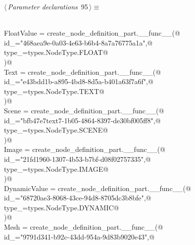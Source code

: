 \documentclass[
    a4paper,      %
    10pt,         %
    openright,    %
    notitlepage,  %
    parskip=half, %
]{scrreprt}       %
\theoremstyle{definition}                    %
\begin{document}
\begin{flushleft} \small
\begin{minipage}{\linewidth}\label{scrap152}\raggedright\small
{} $\langle\,${\itshape Parameter declarations}\nobreak\ {\footnotesize {95}}$\,\rangle\equiv$
\vspace{-1exm}
\begin{list}{}{} \item
\mbox{}\lstinline@@\\
\mbox{}\lstinline@    FloatValue = create_node_definition_part.__func__(@\\
\mbox{}\lstinline@        id_="468aea9e-0a03-4e63-b6b4-8a7a76775a1a",@\\
\mbox{}\lstinline@        type_=types.NodeType.FLOAT@\\
\mbox{}\lstinline@    )@\\
\mbox{}\lstinline@    Text = create_node_definition_part.__func__(@\\
\mbox{}\lstinline@        id_="e43bdd1b-a895-4bd8-8d5a-b401a63f7a6f",@\\
\mbox{}\lstinline@        type_=types.NodeType.TEXT@\\
\mbox{}\lstinline@    )@\\
\mbox{}\lstinline@    Scene = create_node_definition_part.__func__(@\\
\mbox{}\lstinline@        id_="bfb47e7text7-1b05-4864-8397-de30bf005ff8",@\\
\mbox{}\lstinline@        type_=types.NodeType.SCENE@\\
\mbox{}\lstinline@    )@\\
\mbox{}\lstinline@    Image = create_node_definition_part.__func__(@\\
\mbox{}\lstinline@        id_="21fd1960-1307-4b53-b7bf-d08f02757335",@\\
\mbox{}\lstinline@        type_=types.NodeType.IMAGE@\\
\mbox{}\lstinline@    )@\\
\mbox{}\lstinline@    DynamicValue = create_node_definition_part.__func__(@\\
\mbox{}\lstinline@        id_="68720ae3-8068-43ce-94d8-8705dc3b8bfe",@\\
\mbox{}\lstinline@        type_=types.NodeType.DYNAMIC@\\
\mbox{}\lstinline@    )@\\
\mbox{}\lstinline@    Mesh = create_node_definition_part.__func__(@\\
\mbox{}\lstinline@        id_="9791d341-b92c-43dd-954a-9d83b9020e43",@\\

\end{list}
\end{minipage}
\end{flushleft}
\end{document}
